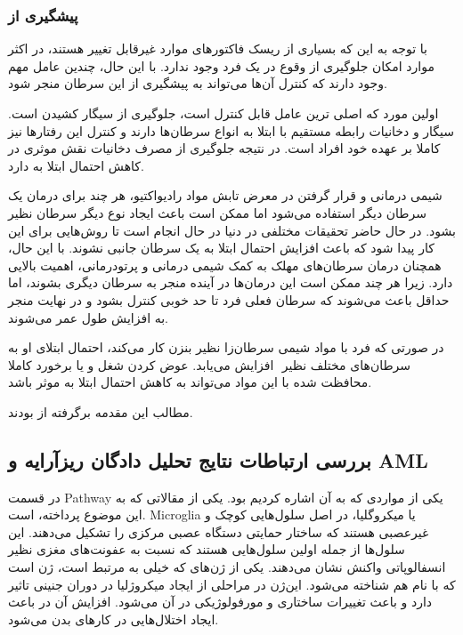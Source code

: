 \documentclass[12pt]{article}
\begin{document}
\subsubsection{پیشگیری از }

با توجه به این که بسیاری از ریسک فاکتور‌های  موارد غیرقابل تغییر هستند، در اکثر موارد امکان جلوگیری از وقوع  در یک فرد وجود ندارد. با این حال، چندین عامل مهم وجود دارند که کنترل آن‌ها می‌تواند به پیشگیری از این سرطان منجر شود.

اولین مورد که اصلی ترین عامل قابل کنترل است، جلوگیری از سیگار کشیدن است. سیگار و دخانیات رابطه مستقیم با ابتلا به انواع سرطان‌ها دارند و کنترل این رفتار‌ها نیز کاملا بر عهده خود افراد است. در نتیجه جلوگیری از مصرف دخانیات نقش موثری در کاهش احتمال ابتلا به  دارد.

شیمی درمانی و قرار گرفتن در معرض تابش مواد رادیواکتیو، هر چند برای درمان یک سرطان دیگر استفاده می‌شود اما ممکن است باعث ایجاد نوع دیگر سرطان نظیر  بشود. در حال حاضر تحقیقات مختلفی در دنیا در حال انجام است تا روش‌هایی برای این کار پیدا شود که باعث افزایش احتمال ابتلا به یک سرطان جانبی نشوند. با این حال، همچنان درمان سرطان‌های مهلک به کمک شیمی درمانی و پرتودرمانی، اهمیت بالایی دارد. زیرا هر چند ممکن است این درمان‌ها در آینده منجر به سرطان دیگری بشوند، اما حداقل باعث می‌شوند که سرطان فعلی فرد تا حد خوبی کنترل بشود و در نهایت منجر به افزایش طول عمر می‌شوند.

در صورتی که فرد با مواد شیمی سرطان‌زا نظیر بنزن کار می‌کند، احتمال ابتلای او به سرطان‌های مختلف نظیر ‌ افزایش می‌یابد. عوض کردن شغل و یا برخورد کاملا محافظت شده با این مواد می‌تواند به کاهش احتمال ابتلا به  موثر باشد.
 	
مطالب این مقدمه برگرفته از \cite{acs} 
 بودند.


\subsection{بررسی ارتباطات نتایج تحلیل دادگان ریزآرایه و AML}


در قسمت Pathway یکی از مواردی که به آن اشاره کردیم
بود. یکی از مقالاتی که به این موضوع پرداخته،\cite{microglia}
است. Microglia یا میکروگلیا، در اصل سلول‌هایی کوچک و غیرعصبی هستند که ساختار حمایتی دستگاه عصبی مرکزی را تشکیل می‌دهند. این سلول‌ها از جمله اولین سلول‌هایی هستند که نسبت به عفونت‌های مغزی نظیر انسفالوپاتی واکنش نشان می‌دهند. یکی از ژن‌های که خیلی به  مرتبط است،‌ ژن  است که با نام  هم شناخته می‌شود. این‌ژن در مراحلی از ایجاد میکروژلیا در دوران جنینی تاثیر دارد و باعث تغییرات ساختاری و مورفولوژیکی در آن می‌شود. افزایش آن در  باعث ایجاد اختلال‌هایی در کار‌های بدن می‌شود.
\end{document}
